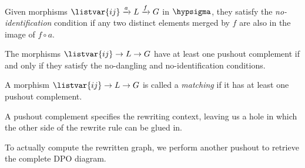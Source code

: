 \begin{definition}
    Given morphisms \(\listvar{ij} \xrightarrow{a} L \xrightarrow{f} G\) in
    \(\hypsigma\), they satisfy the \emph{no-identification} condition if any
    two distinct elements merged by \(f\) are also in the image of \(f \circ a\).
\end{definition}

\begin{proposition}
    \label{prop:pushout-complement}
    The morphisms \(\listvar{ij} \to L \to G\) have at least one pushout complement if
    and only if they satisfy the no-dangling and no-identification conditions.
\end{proposition}

\begin{definition}
    A morphism \(\listvar{ij} \to L \to G\) is called a \emph{matching} if it
    has at least one pushout complement.
\end{definition}

A pushout complement specifies the rewriting context, leaving us a hole in which
the other side of the rewrite rule can be glued in.

\begin{center}
\end{center}

To actually compute the rewritten graph, we perform another pushout to retrieve
the complete DPO diagram.

\begin{center}
\end{center}

\begin{example}
\end{example}